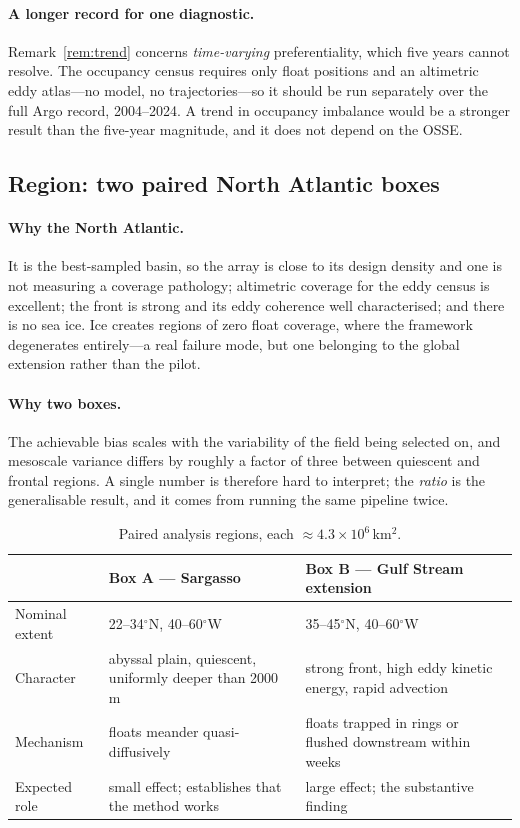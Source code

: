 \documentclass[11pt]{article}
\begin{document}
\paragraph{A longer record for one diagnostic.} Remark~\ref{rem:trend} concerns
\emph{time-varying} preferentiality, which five years cannot resolve. The occupancy census
requires only float positions and an altimetric eddy atlas---no model, no trajectories---so it
should be run separately over the full Argo record, 2004--2024. A trend in occupancy imbalance
would be a stronger result than the five-year magnitude, and it does not depend on the OSSE.

\subsection{Region: two paired North Atlantic boxes}
\label{sec:region}

\paragraph{Why the North Atlantic.} It is the best-sampled basin, so the array is close to its
design density and one is not measuring a coverage pathology; altimetric coverage for the eddy
census is excellent; the front is strong and its eddy coherence well characterised; and there
is no sea ice. Ice creates regions of zero float coverage, where the framework degenerates
entirely---a real failure mode, but one belonging to the global extension rather than the
pilot.

\paragraph{Why two boxes.} The achievable bias scales with the variability of the field being
selected on, and mesoscale variance differs by roughly a factor of three between quiescent and
frontal regions. A single number is therefore hard to interpret; the \emph{ratio} is the
generalisable result, and it comes from running the same pipeline twice.

\begin{table}[h]
\centering
\begin{tabular}{p{}p{}p{}}
\toprule
 & Box A --- Sargasso & Box B --- Gulf Stream extension \\
\midrule
Nominal extent & 22--34$^\circ$N, 40--60$^\circ$W & 35--45$^\circ$N, 40--60$^\circ$W \\
Character & abyssal plain, quiescent, uniformly deeper than 2000\,m & strong front, high eddy
kinetic energy, rapid advection \\
Mechanism & floats meander quasi-diffusively & floats trapped in rings or flushed downstream
within weeks \\
Expected role & small effect; establishes that the method works & large effect; the substantive
finding \\
\bottomrule
\end{tabular}
\caption{Paired analysis regions, each $\approx 4.3\times10^{6}$\,km$^2$.}
\end{table}
\end{document}
